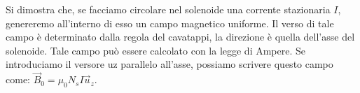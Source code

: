 Si dimostra che, se facciamo circolare nel solenoide una corrente stazionaria $I$, genereremo all'interno di esso un campo magnetico uniforme. Il verso di tale campo è determinato dalla regola del cavatappi, la direzione è quella dell'asse del solenoide. Tale campo può essere calcolato con la legge di Ampere. Se introduciamo il versore uz parallelo all'asse, possiamo scrivere questo campo come: $\vec{B}_0 = \mu_0 N_sI\vec{u}_z$.

\begin{figure}[htpb]
	\centering


	\begin{tikzpicture}[x=0.75pt,y=0.75pt,yscale=-1,xscale=1]


\end{tikzpicture}
\end{figure}
